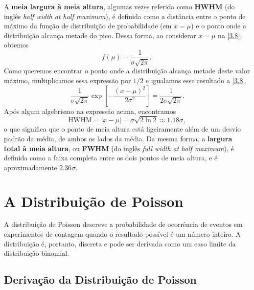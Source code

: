 A \textbf{meia largura à meia altura}, algumas vezes referida como \textbf{HWHM} (do inglês \textit{half width at half maximum}), é definida como a distância entre o ponto de máximo da função de distribuição de probabilidade (em $x = \mu$) e o ponto onde a distribuição alcança metade do pico. Dessa forma, ao considerar $x = \mu$ na \autoref{3.8}, obtemos
\begin{equation*}
f(\mu) = \dfrac{1}{\sigma\sqrt{2\pi}},
\end{equation*} 
Como queremos encontrar o ponto onde a distribuição alcança metade deste valor máximo, multiplicamos essa expressão por $1/2$ e igualamos esse resultado a \autoref{3.8},
\begin{equation*}
\dfrac{1}{\sigma\sqrt{2\pi}} \exp\left[-\dfrac{(x-\mu)^2}{2\sigma^2}\right] = \dfrac{1}{2\sigma\sqrt{2\pi}}.
\end{equation*}
Após algum algebrismo na expressão acima, encontramos
\begin{equation*}
\text{HWHM} = |x - \mu| = \sigma \sqrt{2 \ln 2} \approx 1.18 \sigma,
\end{equation*}
o que significa que o ponto de meia altura está ligeiramente além de um desvio padrão da média, de ambos os lados da média. Da mesma forma, a \textbf{largura total à meia altura}, ou \textbf{FWHM} (do inglês \textit{full width at half maximum}), é definida como a faixa completa entre os dois pontos de meia altura, e é aproximadamente $2.36 \sigma$.

\section{A Distribuição de Poisson}

A distribuição de Poisson descreve a probabilidade de ocorrência de eventos em experimentos de contagem quando o resultado possível é um número inteiro. A distribuição é, portanto, discreta e pode ser derivada como um caso limite da distribuição binomial.

\subsection{Derivação da Distribuição de Poisson}

